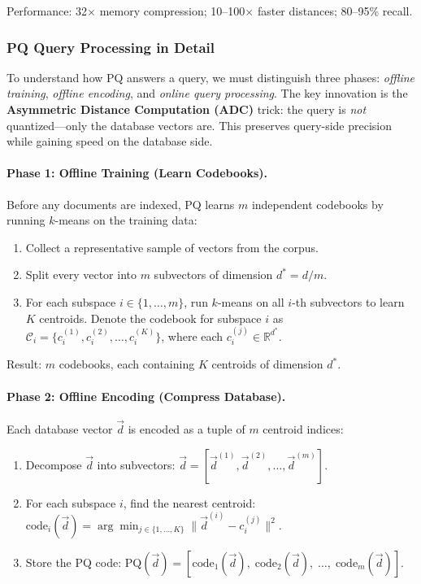 \documentclass[11pt,a4paper]{article}
\theoremstyle{definition}
\theoremstyle{plain}
\begin{document}
Performance: 32$\times$ memory compression; 10--100$\times$ faster distances; 80--95\% recall.

\subsubsection{PQ Query Processing in Detail}

To understand how PQ answers a query, we must distinguish three phases: \emph{offline training}, \emph{offline encoding}, and \emph{online query processing}. The key innovation is the \textbf{Asymmetric Distance Computation (ADC)} trick: the query is \emph{not} quantized---only the database vectors are. This preserves query-side precision while gaining speed on the database side.

\paragraph{Phase 1: Offline Training (Learn Codebooks).}
Before any documents are indexed, PQ learns $m$ independent codebooks by running $k$-means on the training data:

\begin{enumerate}[nosep]
    \item Collect a representative sample of vectors from the corpus.
    \item Split every vector into $m$ subvectors of dimension $d^* = d/m$.
    \item For each subspace $i \in \{1, \ldots, m\}$, run $k$-means on all $i$-th subvectors to learn $K$ centroids. Denote the codebook for subspace $i$ as $\mathcal{C}_i = \{c_i^{(1)}, c_i^{(2)}, \ldots, c_i^{(K)}\}$, where each $c_i^{(j)} \in \mathbb{R}^{d^*}$.
\end{enumerate}

Result: $m$ codebooks, each containing $K$ centroids of dimension $d^*$.

\paragraph{Phase 2: Offline Encoding (Compress Database).}
Each database vector $\vec{d}$ is encoded as a tuple of $m$ centroid indices:

\begin{enumerate}[nosep]
    \item Decompose $\vec{d}$ into subvectors: $\vec{d} = [\vec{d}^{(1)}, \vec{d}^{(2)}, \ldots, \vec{d}^{(m)}]$.
    \item For each subspace $i$, find the nearest centroid: $\mathrm{code}_i(\vec{d}) = \arg\min_{j \in \{1,\ldots,K\}} \|\vec{d}^{(i)} - c_i^{(j)}\|^2$.
    \item Store the PQ code: $\mathrm{PQ}(\vec{d}) = [\mathrm{code}_1(\vec{d}),\; \mathrm{code}_2(\vec{d}),\; \ldots,\; \mathrm{code}_m(\vec{d})]$.
\end{enumerate}
\end{document}
